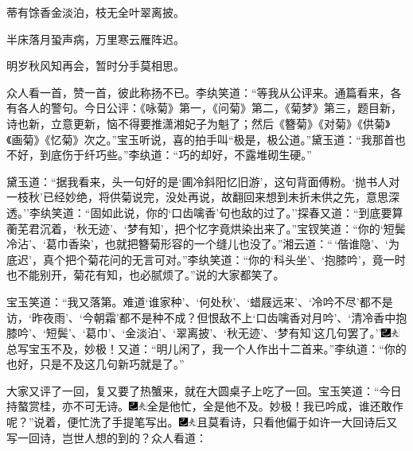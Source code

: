 蒂有馀香金淡泊，枝无全叶翠离披。

半床落月蛩声病，万里寒云雁阵迟。

明岁秋风知再会，暂时分手莫相思。

众人看一首，赞一首，彼此称扬不已。李纨笑道：``等我从公评来。通篇看来，各有各人的警句。今日公评：《咏菊》第一，《问菊》第二，《菊梦》第三，题目新，诗也新，立意更新，恼不得要推潇湘妃子为魁了；然后《簪菊》《对菊》《供菊》《画菊》《忆菊》次之。''宝玉听说，喜的拍手叫``极是，极公道。''黛玉道：``我那首也不好，到底伤于纤巧些。''李纨道：``巧的却好，不露堆砌生硬。''

黛玉道：``据我看来，头一句好的是`圃冷斜阳忆旧游'，这句背面傅粉。`抛书人对一枝秋'已经妙绝，将供菊说完，没处再说，故翻回来想到未折未供之先，意思深透。''李纨笑道：``固如此说，你的`口齿噙香'句也敌的过了。''探春又道：``到底要算蘅芜君沉着，`秋无迹'、`梦有知'，把个忆字竟烘染出来了。''宝钗笑道：``你的`短鬓冷沾'、`葛巾香染'，也就把簪菊形容的一个缝儿也没了。''湘云道：``\,`偕谁隐'、`为底迟'，真个把个菊花问的无言可对。''李纨笑道：``你的`科头坐'、`抱膝吟'，竟一时也不能别开，菊花有知，也必腻烦了。''说的大家都笑了。

宝玉笑道：``我又落第。难道`谁家种'、`何处秋'、`蜡屐远来'、`冷吟不尽'都不是访，`昨夜雨'、`今朝霜'都不是种不成？但恨敌不上`口齿噙香对月吟'、`清冷香中抱膝吟'、`短鬓'、`葛巾'、`金淡泊'、`翠离披'、`秋无迹'、`梦有知'这几句罢了。''{\includegraphics[width=3mm]{../Images/00003}\includegraphics[width=3mm]{../Images/00012}\footnotesize \kaishu 总写宝玉不及，妙极！}又道：``明儿闲了，我一个人作出十二首来。''李纨道：``你的也好，只是不及这几句新巧就是了。''

大家又评了一回，复又要了热蟹来，就在大圆桌子上吃了一回。宝玉笑道：``今日持螯赏桂，亦不可无诗。{\includegraphics[width=3mm]{../Images/00003}\includegraphics[width=3mm]{../Images/00012}\footnotesize \kaishu 全是他忙，全是他不及。妙极！}我已吟成，谁还敢作呢？''说着，便忙洗了手提笔写出。{\includegraphics[width=3mm]{../Images/00003}\includegraphics[width=3mm]{../Images/00012}\footnotesize \kaishu 且莫看诗，只看他偏于如许一大回诗后又写一回诗，岂世人想的到的？}众人看道：

